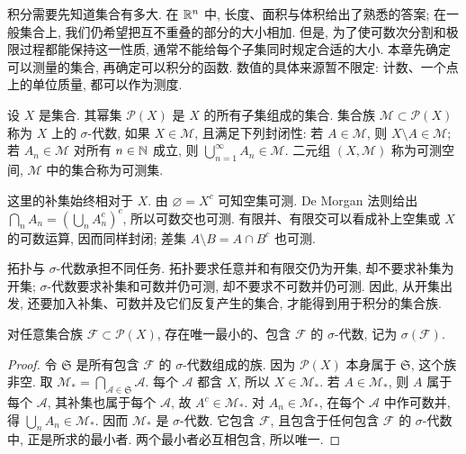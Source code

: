 
积分需要先知道集合有多大. 在 $\mathbb R^n$ 中, 长度、面积与体积给出了熟悉的答案; 在一般集合上, 我们仍希望把互不重叠的部分的大小相加. 但是, 为了使可数次分割和极限过程都能保持这一性质, 通常不能给每个子集同时规定合适的大小. 本章先确定可以测量的集合, 再确定可以积分的函数. 数值的具体来源暂不限定: 计数、一个点上的单位质量, 都可以作为测度.

\begin{definition}\label{ra:c1:sigma}
设 $X$ 是集合. 其幂集 $\mathcal P(X)$ 是 $X$ 的所有子集组成的集合. 集合族 $\mathcal M\subset\mathcal P(X)$ 称为 $X$ 上的 $\sigma$-代数, 如果 $X\in\mathcal M$, 且满足下列封闭性: 若 $A\in\mathcal M$, 则 $X\setminus A\in\mathcal M$; 若 $A_n\in\mathcal M$ 对所有 $n\in\mathbb N$ 成立, 则 $\bigcup_{n=1}^{\infty}A_n\in\mathcal M$. 二元组 $(X,\mathcal M)$ 称为可测空间, $\mathcal M$ 中的集合称为可测集.
\end{definition}
这里的补集始终相对于 $X$. 由 $\varnothing=X^c$ 可知空集可测. De Morgan 法则给出 $\bigcap_n A_n=(\bigcup_n A_n^c)^c$, 所以可数交也可测. 有限并、有限交可以看成补上空集或 $X$ 的可数运算, 因而同样封闭; 差集 $A\setminus B=A\cap B^c$ 也可测.

拓扑与 $\sigma$-代数承担不同任务. 拓扑要求任意并和有限交仍为开集, 却不要求补集为开集; $\sigma$-代数要求补集和可数并仍可测, 却不要求不可数并仍可测. 因此, 从开集出发, 还要加入补集、可数并及它们反复产生的集合, 才能得到用于积分的集合族.

\begin{proposition}\label{ra:c1:generated}
对任意集合族 $\mathcal F\subset\mathcal P(X)$, 存在唯一最小的、包含 $\mathcal F$ 的 $\sigma$-代数, 记为 $\sigma(\mathcal F)$.
\end{proposition}
\begin{proof}
令 $\mathfrak S$ 是所有包含 $\mathcal F$ 的 $\sigma$-代数组成的族. 因为 $\mathcal P(X)$ 本身属于 $\mathfrak S$, 这个族非空. 取 $\mathcal M_* =\bigcap_{\mathcal A\in\mathfrak S}\mathcal A$. 每个 $\mathcal A$ 都含 $X$, 所以 $X\in\mathcal M_*$. 若 $A\in\mathcal M_*$, 则 $A$ 属于每个 $\mathcal A$, 其补集也属于每个 $\mathcal A$, 故 $A^c\in\mathcal M_*$. 对 $A_n\in\mathcal M_*$, 在每个 $\mathcal A$ 中作可数并, 得 $\bigcup_n A_n\in\mathcal M_*$. 因而 $\mathcal M_*$ 是 $\sigma$-代数. 它包含 $\mathcal F$, 且包含于任何包含 $\mathcal F$ 的 $\sigma$-代数中, 正是所求的最小者. 两个最小者必互相包含, 所以唯一.
\end{proof}

